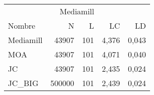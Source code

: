 \begin{tabular}{lrrrr}
	\toprule
	\multicolumn{5}{c}{Mediamill}            \\[3pt]
	Nombre    & N      & L   & LC    & LD    \\
	\midrule
	Mediamill & 43907  & 101 & 4,376 & 0,043 \\[3pt]
	MOA       & 43907  & 101 & 4,071 & 0,040 \\[3pt]
	JC        & 43907  & 101 & 2,435 & 0,024 \\[3pt]
	JC\_BIG   & 500000 & 101 & 2,439 & 0,024 \\
	\bottomrule
\end{tabular}
